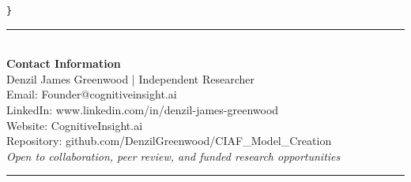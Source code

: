 \documentclass[12pt,a4paper]{article}
\begin{document}
\begin{center}
\begin{verbatim}
}
\end{verbatim}
\vspace{0.25cm}
\textcolor{ciafgray}{\rule{0.8\textwidth}{0.4pt}}\\
\vspace{0.4cm}
\textbf{Contact Information}\\
\vspace{0.25cm}
Denzil James Greenwood | Independent Researcher\\
Email: Founder@cognitiveinsight.ai\\
LinkedIn: www.linkedin.com/in/denzil-james-greenwood\\
Website: CognitiveInsight.ai\\
Repository: github.com/DenzilGreenwood/CIAF\_Model\_Creation\\
\vspace{0.25cm}
\textit{Open to collaboration, peer review, and funded research opportunities}\\
\vspace{0.4cm}
\textcolor{ciafgray}{\rule{0.8\textwidth}{0.25pt}}
\end{center}
\end{document}

